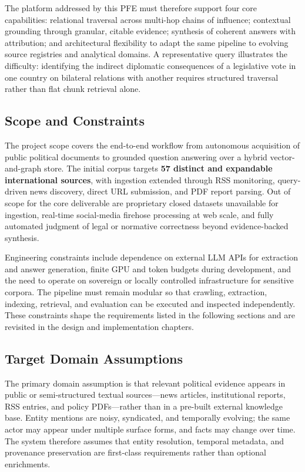 The platform addressed by this PFE must therefore support four core capabilities: relational traversal across multi-hop chains of influence; contextual grounding through granular, citable evidence; synthesis of coherent answers with attribution; and architectural flexibility to adapt the same pipeline to evolving source registries and analytical domains. A representative query illustrates the difficulty: identifying the indirect diplomatic consequences of a legislative vote in one country on bilateral relations with another requires structured traversal rather than flat chunk retrieval alone.

\subsection{Scope and Constraints}

The project scope covers the end-to-end workflow from autonomous acquisition of public political documents to grounded question answering over a hybrid vector-and-graph store. The initial corpus targets \textbf{57 distinct and expandable international sources}, with ingestion extended through RSS monitoring, query-driven news discovery, direct URL submission, and PDF report parsing. Out of scope for the core deliverable are proprietary closed datasets unavailable for ingestion, real-time social-media firehose processing at web scale, and fully automated judgment of legal or normative correctness beyond evidence-backed synthesis.

Engineering constraints include dependence on external LLM APIs for extraction and answer generation, finite GPU and token budgets during development, and the need to operate on sovereign or locally controlled infrastructure for sensitive corpora. The pipeline must remain modular so that crawling, extraction, indexing, retrieval, and evaluation can be executed and inspected independently. These constraints shape the requirements listed in the following sections and are revisited in the design and implementation chapters.

\subsection{Target Domain Assumptions}

The primary domain assumption is that relevant political evidence appears in public or semi-structured textual sources---news articles, institutional reports, RSS entries, and policy PDFs---rather than in a pre-built external knowledge base. Entity mentions are noisy, syndicated, and temporally evolving; the same actor may appear under multiple surface forms, and facts may change over time. The system therefore assumes that entity resolution, temporal metadata, and provenance preservation are first-class requirements rather than optional enrichments.

